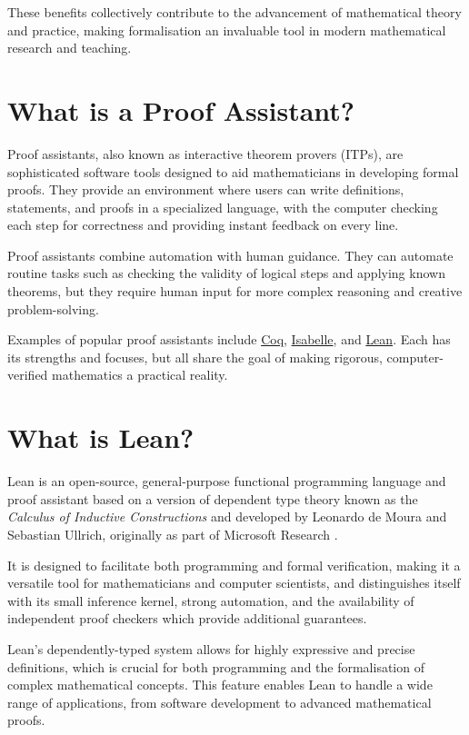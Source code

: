 These benefits collectively contribute to the advancement of mathematical theory and practice,
making formalisation an invaluable tool in modern mathematical research and teaching.

\section{What is a Proof Assistant?}

Proof assistants, also known as interactive theorem provers (ITPs), are sophisticated software tools
designed to aid mathematicians in developing formal proofs. They provide an environment where users
can write definitions, statements, and proofs in a specialized language, with the computer checking
each step for correctness and providing instant feedback on every line.

Proof assistants combine automation with human guidance. They can automate routine tasks such as checking
the validity of logical steps and applying known theorems, but they require human input for more complex
reasoning and creative problem-solving.

Examples of popular proof assistants include \href{https://coq.inria.fr}{Coq}, \href{https://isabelle.in.tum.de}{Isabelle},
and \href{https://lean-lang.org}{Lean}. Each has its strengths and focuses, but all share the goal of
making rigorous, computer-verified mathematics a practical reality.

\newpage
\section{What is Lean?}

Lean is an open-source, general-purpose functional programming language and proof assistant
based on a version of dependent type theory known as the \textit{Calculus of Inductive Constructions} \cite{Carneiro2019} and
developed by Leonardo de Moura and Sebastian Ullrich, originally as part of Microsoft Research \cite{Moura2021}.

It is designed to facilitate both programming and formal verification, making it a versatile tool
for mathematicians and computer scientists, and distinguishes itself with its small inference kernel,
strong automation, and the availability of independent proof checkers which provide additional guarantees.

Lean's dependently-typed system allows for highly expressive and precise definitions, which is crucial
for both programming and the formalisation of complex mathematical concepts.
This feature enables Lean to handle a wide range of applications, from software development to advanced mathematical proofs.

